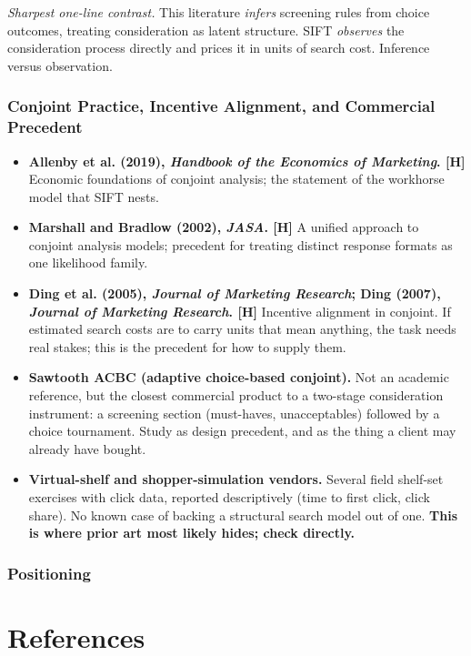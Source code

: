 \documentclass[
  letterpaper,
  DIV=11,
  numbers=noendperiod]{scrartcl}
\providecommand{\tightlist}{%
  \setlength{\itemsep}{0pt}\setlength{\parskip}{0pt}}
\begin{document}
\emph{Sharpest one-line contrast.} This literature \emph{infers}
screening rules from choice outcomes, treating consideration as latent
structure. SIFT \emph{observes} the consideration process directly and
prices it in units of search cost. Inference versus observation.

\subsubsection{Conjoint Practice, Incentive Alignment, and Commercial
Precedent}\label{sec-applit-practice}

\begin{itemize}
\tightlist
\item
  \textbf{Allenby et al. (2019), \emph{Handbook of the Economics of
  Marketing}. {[}H{]}} Economic foundations of conjoint analysis; the
  statement of the workhorse model that SIFT nests.
\item
  \textbf{Marshall and Bradlow (2002), \emph{JASA}. {[}H{]}} A unified
  approach to conjoint analysis models; precedent for treating distinct
  response formats as one likelihood family.
\item
  \textbf{Ding et al. (2005), \emph{Journal of Marketing Research}; Ding
  (2007), \emph{Journal of Marketing Research}. {[}H{]}} Incentive
  alignment in conjoint. If estimated search costs are to carry units
  that mean anything, the task needs real stakes; this is the precedent
  for how to supply them.
\item
  \textbf{Sawtooth ACBC (adaptive choice-based conjoint).} Not an
  academic reference, but the closest commercial product to a two-stage
  consideration instrument: a screening section (must-haves,
  unacceptables) followed by a choice tournament. Study as design
  precedent, and as the thing a client may already have bought.
\item
  \textbf{Virtual-shelf and shopper-simulation vendors.} Several field
  shelf-set exercises with click data, reported descriptively (time to
  first click, click share). No known case of backing a structural
  search model out of one. \textbf{This is where prior art most likely
  hides; check directly.}
\end{itemize}

\subsubsection{Positioning}\label{sec-applit-positioning}

\section*{References}\label{references}
\end{document}

